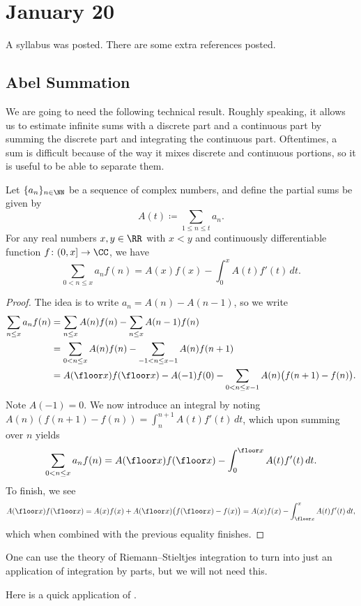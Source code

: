 \documentclass[../notes.tex]{subfiles}
\begin{document}
\section{January 20}

A syllabus was posted. There are some extra references posted.

\subsection{Abel Summation}
We are going to need the following technical result. Roughly speaking, it allows us to estimate infinite sums with a discrete part and a continuous part by summing the discrete part and integrating the continuous part. Oftentimes, a sum is difficult because of the way it mixes discrete and continuous portions, so it is useful to be able to separate them.
\begin{theorem} \label{thm:abel-summation}
	Let $\{a_n\}_{n\in\NN}$ be a sequence of complex numbers, and define the partial sums be given by
	\[A(t)\coloneqq\sum_{1\le n\le t}a_n.\]
	For any real numbers $x,y\in\RR$ with $x<y$ and continuously differentiable function $f\colon(0,x]\to\CC$, we have
	\[\sum_{0<n\le x}a_nf(n)=A(x)f(x)-\int_0^xA(t)f'(t)\,dt.\]
\end{theorem}
\begin{proof}
	The idea is to write $a_n=A(n)-A(n-1)$, so we write
	\begin{align*}
		\sum_{n\le x}a_nf(n) &= \sum_{n\le x}A(n)f(n)-\sum_{n\le x}A(n-1)f(n) \\
		&= \sum_{0<n\le x}A(n)f(n)-\sum_{-1<n\le x-1}A(n)f(n+1) \\
		&= A(\floor x)f(\floor x)-A(-1)f(0)-\sum_{0<n\le x-1}A(n)\big(f(n+1)-f(n)\big).
	\end{align*}
	Note $A(-1)=0$. We now introduce an integral by noting $A(n)(f(n+1)-f(n))=\int_n^{n+1}A(t)f'(t)\,dt$, which upon summing over $n$ yields
	\[\sum_{0<n\le x}a_nf(n)=A(\floor x)f(\floor x)-\int_0^{\floor x}A(t)f'(t)\,dt.\]
	To finish, we see
	\[A(\floor x)f(\floor x)=A(x)f(x)+A(\floor x)\big(f(\floor x)-f(x)\big)=A(x)f(x)-\int_{\floor x}^xA(t)f'(t)\,dt,\]
	which when combined with the previous equality finishes.
\end{proof}
\begin{remark}
	One can use the theory of Riemann--Stieltjes integration to turn  into just an application of integration by parts, but we will not need this.
\end{remark}
Here is a quick application of .
\end{document}
